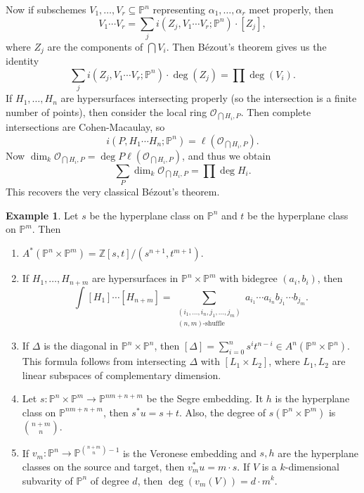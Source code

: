 \documentclass[leqno, openany]{memoir}
\theoremstyle{definition}
\newtheorem{exm}[thm]{Example}
\theoremstyle{remark}
\theoremstyle{plain}
\theoremstyle{definition}
\theoremstyle{remark}
\newcommand{\Z}{\mathbb{Z}}
\renewcommand{\P}{\mathbb{P}}
\newcommand{\mc}[1]{\mathcal{#1}}
\begin{document}
Now if subschemes $V_1, \ldots, V_r \subseteq \P^n$ representing $\alpha_1, \ldots, \alpha_r$ meet properly, then 
\[ V_1 \cdots V_r = \sum_j i(Z_j, V_1 \cdots V_r; \P^n) \cdot [Z_j], \]
where $Z_j$ are the components of $\bigcap V_i$. Then B\'ezout's theorem gives us the identity
\[ \sum_j i(Z_j, V_1 \cdots V_r; \P^n) \cdot \deg(Z_j) = \prod \deg(V_i). \]
If $H_1, \ldots, H_n$ are hypersurfaces intersecting properly (so the intersection is a finite number of points), then consider the local ring $\mc{O}_{\bigcap H_i,P}$. Then complete intersections are Cohen-Macaulay, so 
\[ i(P, H_1 \cdots H_n; \P^n) = \ell(\mc{O}_{\bigcap H_i, P}). \]
Now $\dim_k \mc{O}_{\bigcap H_i, P} = \deg P \ell(\mc{O}_{\bigcap H_i, P})$, and thus we obtain
\[ \sum_P \dim_k \mc{O}_{\bigcap H_i, P} = \prod \deg H_i. \]
This recovers the very classical B\'ezout's theorem.

\begin{exm}
    Let $s$ be the hyperplane class on $\P^n$ and $t$ be the hyperplane class on $\P^m$. Then 
    \begin{enumerate}
        \item $A^*(\P^n \times \P^m) = \Z[s,t]/(s^{n+1}, t^{m+1})$.
        \item If $H_1, \ldots, H_{n+m}$ are hypersurfaces in $\P^n \times \P^m$ with bidegree $(a_i, b_i)$, then
            \[ \int [H_1] \cdots [H_{n+m}] = \sum_{ \substack{(i_1, \ldots, i_n, j_1, \ldots, j_m) \\ (n,m)\text{-shuffle}} } a_{i_1} \cdots a_{i_n} b_{j_1} \cdots b_{j_m}. \]
        \item If $\Delta$ is the diagonal in $\P^n \times \P^n$, then $[\Delta] = \sum_{i=0}^n s^i t^{n-i} \in A^n(\P^n \times \P^n)$. 
            This formula follows from intersecting $\Delta$ with $[L_1 \times L_2]$, where $L_1, L_2$ are linear subspaces of complementary dimension.
        \item Let $s \colon \P^n \times \P^m \to \P^{nm+n+m}$ be the Segre embedding. It $h$ is the hyperplane class on $\P^{nm+n+m}$, then $s^* u = s + t$. Also, the degree of $s(\P^n \times \P^m)$ is $\binom{n+m}{n}$.
        \item If $v_m \colon \P^n \to \P^{\binom{n+m}{n}-1}$ is the Veronese embedding and $s,h$ are the hyperplane classes on the source and target, then $v_m^* u = m \cdot s$. If $V$ is a $k$-dimensional subvarity of $\P^n$ of degree $d$, then $\deg(v_m(V)) = d \cdot m^k$.
    \end{enumerate}
\end{exm}
\end{document}
